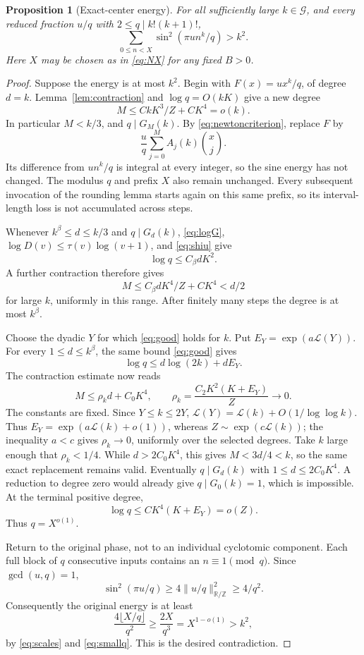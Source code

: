 \documentclass[11pt]{amsart}
\numberwithin{equation}{section}
\newtheorem{proposition}[theorem]{Proposition}
\theoremstyle{remark}
\newcommand{\Z}{\mathbb Z}
\newcommand{\R}{\mathbb R}
\newcommand{\dist}[1]{\lVert #1\rVert_{\R/\Z}}
\begin{document}
\begin{proposition}[Exact-center energy]\label{prop:center}
For all sufficiently large \(k\in\mathcal G\), and every reduced
fraction \(u/q\) with \(2\le q\mid k!(k+1)!\),
\begin{equation}\label{eq:center}
 \sum_{0\le n<X}\sin^2(\pi un^k/q)>k^2.
\end{equation}
Here \(X\) may be chosen as in \eqref{eq:NX} for any fixed \(B>0\).
\end{proposition}
\begin{proof}
Suppose the energy is at most \(k^2\). Begin with
\(F(x)=ux^k/q\), of degree \(d=k\).
Lemma~\ref{lem:contraction} and \(\log q=O(kK)\) give a new degree
\[
 M\le CkK^3/Z+CK^4=o(k).
\]
In particular \(M<k/3\), and \(q\mid G_M(k)\).
By \eqref{eq:newtoncriterion}, replace \(F\) by
\[
 \frac uq\sum_{j=0}^M A_j(k)\binom{x}{j}.
\]
Its difference from \(un^k/q\) is integral at every integer, so the
sine energy has not changed. The modulus \(q\) and prefix \(X\) also
remain unchanged.
Every subsequent invocation of the rounding lemma starts again on this
same prefix, so its interval-length loss is not accumulated across steps.

Whenever \(k^\beta\le d\le k/3\) and \(q\mid G_d(k)\),
\eqref{eq:logG}, \(\log D(v)\le\tau(v)\log(v+1)\), and
\eqref{eq:shiu} give
\[
 \log q\le C_\beta dK^2.
\]
A further contraction therefore gives
\[
 M\le C_\beta dK^4/Z+CK^4<d/2
\]
for large \(k\), uniformly in this range.
After finitely many steps the degree is at most \(k^\beta\).

Choose the dyadic \(Y\) for which \eqref{eq:good} holds for \(k\).
Put \(E_Y=\exp(a\mathcal L(Y))\).
For every \(1\le d\le k^\beta\), the same bound \eqref{eq:good} gives
\[
 \log q\le d\log(2k)+dE_Y.
\]
The contraction estimate now reads
\begin{equation}\label{eq:smallcontraction}
 M\le\rho_k d+C_0K^4,\qquad
 \rho_k=\frac{C_2K^2(K+E_Y)}Z\longrightarrow0.
\end{equation}
The constants are fixed. Since \(Y\le k\le2Y\),
\(\mathcal L(Y)=\mathcal L(k)+O(1/\log\log k)\).
Thus \(E_Y=\exp(a\mathcal L(k)+o(1))\), whereas
\(Z\sim\exp(c\mathcal L(k))\); the inequality \(a<c\) gives
\(\rho_k\to0\), uniformly over the selected degrees.
Take \(k\) large enough that \(\rho_k<1/4\).
While \(d>2C_0K^4\), this gives \(M<3d/4<k\), so the same exact
replacement remains valid.
Eventually \(q\mid G_d(k)\) with \(1\le d\le2C_0K^4\).
A reduction to degree zero would already give \(q\mid G_0(k)=1\),
which is impossible. At the terminal positive degree,
\begin{equation}\label{eq:smallq}
 \log q\le CK^4(K+E_Y)=o(Z).
\end{equation}
Thus \(q=X^{o(1)}\).

Return to the original phase, not to an individual cyclotomic component.
Each full block of \(q\) consecutive inputs contains an \(n\equiv1\pmod q\).
Since \(\gcd(u,q)=1\),
\[
 \sin^2(\pi u/q)\ge4\dist{u/q}^2\ge4/q^2.
\]
Consequently the original energy is at least
\[
 \frac{4\lfloor X/q\rfloor}{q^2}
 \ge\frac{2X}{q^3}=X^{1-o(1)}>k^2,
\]
by \eqref{eq:scales} and \eqref{eq:smallq}. This is the desired contradiction.
\end{proof}
\end{document}
